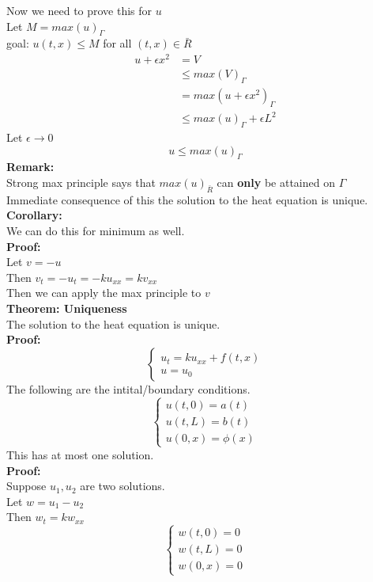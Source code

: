 \documentclass{article}
\begin{document}
Now we need to prove this for $u$\\
Let $M = max(u)_{\Gamma}$\\
goal: $u(t,x) \leq M$ for all $(t,x) \in \bar{R}$\\
\begin{align*}
    u + \epsilon x^2 &= V\\
    & \leq max(V)_{\Gamma} \\
    & = max(u + \epsilon x^2)_{\Gamma}\\
    & \leq max(u)_{\Gamma} + \epsilon L^2
\end{align*}
Let $\epsilon \to 0$\\
$$ u \leq max(u)_{\Gamma}$$
\textbf{Remark:} \\
Strong max principle says that $max(u)_{\bar{R}}$ can \textbf{only} be attained on $\Gamma$\\
Immediate consequence of this the solution to the heat equation is unique.\\
\textbf{Corollary:} \\
We can do this for minimum as well.\\
\textbf{Proof:} \\
Let $v = -u$\\
Then $v_t = -u_t = -k u_{xx} = k v_{xx}$\\
Then we can apply the max principle to $v$\\
\textbf{Theorem: Uniqueness} \\
The solution to the heat equation is unique.\\
\textbf{Proof:} \\
$$\begin{cases}
    u_t = k u_{xx} + f(t,x)\\
    u = u_0 
\end{cases}
$$
The following are the intital/boundary conditions.\\
$$\begin{cases}
    u(t,0) = a(t)\\
    u(t,L) = b(t)\\
    u(0,x) = \phi(x)
\end{cases}
$$
This has at most one solution.\\
\textbf{Proof:} \\
Suppose $u_1, u_2$ are two solutions.\\
Let $w = u_1 - u_2$\\
Then $w_t = k w_{xx}$\\
$$\begin{cases}
    w(t,0) = 0\\
    w(t,L) = 0\\
    w(0,x) = 0
\end{cases}
$$
\end{document}
